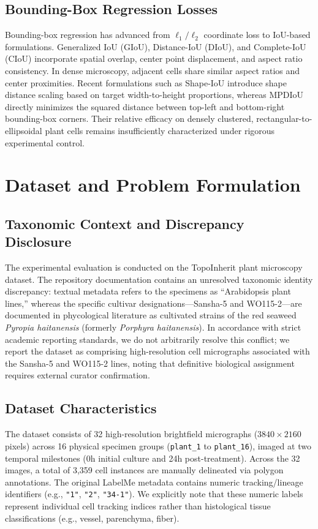 \documentclass[conference]{IEEEtran}
\begin{document}
\subsection{Bounding-Box Regression Losses}
Bounding-box regression has advanced from $\ell_1/\ell_2$ coordinate loss to IoU-based formulations. Generalized IoU (GIoU), Distance-IoU (DIoU), and Complete-IoU (CIoU) \cite{zheng2022enhancing} incorporate spatial overlap, center point displacement, and aspect ratio consistency. In dense microscopy, adjacent cells share similar aspect ratios and center proximities. Recent formulations such as Shape-IoU \cite{zhang2023shapeiou} introduce shape distance scaling based on target width-to-height proportions, whereas MPDIoU \cite{ma2023mpdiou} directly minimizes the squared distance between top-left and bottom-right bounding-box corners. Their relative efficacy on densely clustered, rectangular-to-ellipsoidal plant cells remains insufficiently characterized under rigorous experimental control.

\section{Dataset and Problem Formulation}

\subsection{Taxonomic Context and Discrepancy Disclosure}
The experimental evaluation is conducted on the TopoInherit plant microscopy dataset. The repository documentation contains an unresolved taxonomic identity discrepancy: textual metadata refers to the specimens as ``Arabidopsis plant lines,'' whereas the specific cultivar designations---Sansha-5 and WO115-2---are documented in phycological literature as cultivated strains of the red seaweed \textit{Pyropia haitanensis} (formerly \textit{Porphyra haitanensis}). In accordance with strict academic reporting standards, we do not arbitrarily resolve this conflict; we report the dataset as comprising high-resolution cell micrographs associated with the Sansha-5 and WO115-2 lines, noting that definitive biological assignment requires external curator confirmation.

\subsection{Dataset Characteristics}
The dataset consists of 32 high-resolution brightfield micrographs ($3840 \times 2160$ pixels) across 16 physical specimen groups (\texttt{plant\_1} to \texttt{plant\_16}), imaged at two temporal milestones (0h initial culture and 24h post-treatment). Across the 32 images, a total of 3,359 cell instances are manually delineated via polygon annotations. The original LabelMe metadata contains numeric tracking/lineage identifiers (e.g., \texttt{"1"}, \texttt{"2"}, \texttt{"34-1"}). We explicitly note that these numeric labels represent individual cell tracking indices rather than histological tissue classifications (e.g., vessel, parenchyma, fiber).
\end{document}
